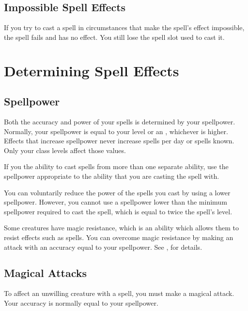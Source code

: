     \subsection{Impossible Spell Effects}
        If you try to cast a spell in circumstances that make the spell's effect impossible, the spell fails and has no effect.
        You still lose the spell slot used to cast it.

\section{Determining Spell Effects}

    \subsection{Spellpower}

        Both the accuracy and power of your spells is determined by your spellpower.
        Normally, your spellpower is equal to your level or an , whichever is higher.
        Effects that increase spellpower never increase spells per day or spells known.
        Only your class levels affect those values.

         If you the ability to cast spells from more than one separate ability, use the spellpower appropriate to the ability that you are casting the spell with.

         You can voluntarily reduce the power of the spells you cast by using a lower spellpower.
        However, you cannot use a spellpower lower than the minimum spellpower required to cast the spell, which is equal to twice the spell's level.

         Some creatures have magic resistance, which is an ability which allows them to resist  effects such as spells.
        You can overcome magic resistance by making an attack with an accuracy equal to your spellpower.
        See , for details.

    \subsection{Magical Attacks}

        To affect an unwilling creature with a spell, you must make a magical attack.
        Your accuracy is normally equal to your spellpower.

